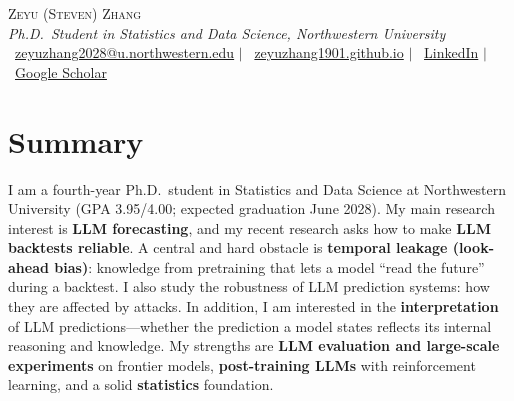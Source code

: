 \documentclass[10.5pt]{article}
\begin{document}
\begin{center}
  {\Huge\scshape Zeyu (Steven) Zhang}\\[6pt]
  {\color{metagray}\itshape Ph.D.\ Student in Statistics and Data Science, Northwestern University}\\[6pt]
  {\small
    \faEnvelope\ \href{mailto:zeyuzhang2028@u.northwestern.edu}{zeyuzhang2028@u.northwestern.edu}
    \;$|$\;
    \faGlobe\ \href{https://zeyuzhang1901.github.io}{zeyuzhang1901.github.io}
    \;$|$\;
    \faLinkedin\ \href{https://www.linkedin.com/in/zeyu-zhang-42813a271/}{LinkedIn}
    \;$|$\;
    \faGraduationCap\ \href{https://scholar.google.com/citations?user=dr-xetEAAAAJ}{Google Scholar}
  }
\end{center}

\section{Summary}
I am a fourth-year Ph.D.\ student in Statistics and Data Science at Northwestern University (GPA 3.95/4.00; expected graduation June 2028). My main research interest is \textbf{LLM forecasting}, and my recent research asks how to make \textbf{LLM backtests reliable}. A central and hard obstacle is \textbf{temporal leakage (look-ahead bias)}: knowledge from pretraining that lets a model ``read the future'' during a backtest. I also study the robustness of LLM prediction systems: how they are affected by attacks. In addition, I am interested in the \textbf{interpretation} of LLM predictions---whether the prediction a model states reflects its internal reasoning and knowledge. My strengths are \textbf{LLM evaluation and large-scale experiments} on frontier models, \textbf{post-training LLMs} with reinforcement learning, and a solid \textbf{statistics} foundation.

\end{document}
